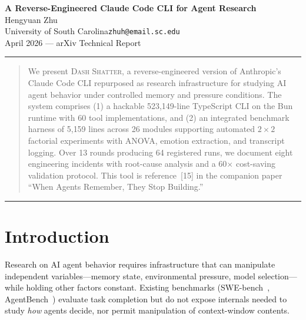 \documentclass[10pt,a4paper]{article}
\begin{document}
\begin{center}
  {\Large\sffamily\bfseries\color{deep}
    A Reverse-Engineered Claude Code CLI for Agent Research}\\[8pt]
  {\normalsize Hengyuan Zhu}\\[2pt]
  {\small University of South Carolina\quad\color{faded}\texttt{zhuh@email.sc.edu}}\\[6pt]
  {\small\color{faded} April 2026 --- arXiv Technical Report}
\end{center}
\vspace{3pt}\hrule height 0.5pt\vspace{6pt}

\begin{abstract}\noindent
We present \textsc{Dash Shatter}, a reverse-engineered version of Anthropic's Claude Code CLI repurposed as research infrastructure for studying AI agent behavior under controlled memory and pressure conditions. The system comprises (1) a hackable 523{,}149-line TypeScript CLI on the Bun runtime with 60 tool implementations, and (2) an integrated benchmark harness of 5{,}159 lines across 26 modules supporting automated $2 \times 2$ factorial experiments with ANOVA, emotion extraction, and transcript logging. Over 13 rounds producing 64 registered runs, we document eight engineering incidents with root-cause analysis and a 60$\times$ cost-saving validation protocol. This tool is reference~[15] in the companion paper ``When Agents Remember, They Stop Building.''
\end{abstract}
\vspace{2pt}\hrule height 0.3pt\vspace{6pt}

\section{Introduction}\label{sec:intro}

Research on AI agent behavior requires infrastructure that can manipulate independent variables---memory state, environmental pressure, model selection---while holding other factors constant. Existing benchmarks (SWE-bench~\cite{jimenez2024swebench}, AgentBench~\cite{liu2023agentbench}) evaluate task completion but do not expose internals needed to study \emph{how} agents decide, nor permit manipulation of context-window contents.
\end{document}

